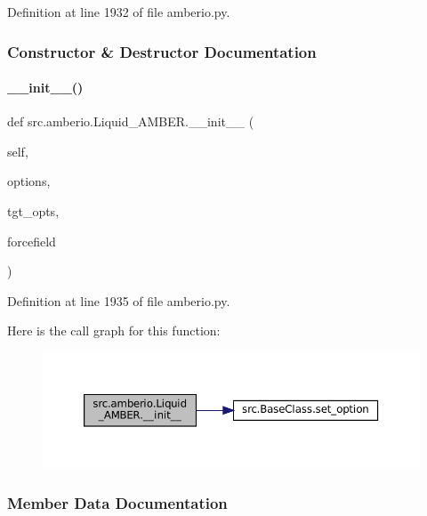 Definition at line 1932 of file amberio.\+py.



\subsubsection{Constructor \& Destructor Documentation}
\mbox{\label{classsrc_1_1amberio_1_1Liquid__AMBER_a2ef4bb756f0d95903ce9aa7cf31f3f4d}} 
\paragraph{\texorpdfstring{\+\_\+\+\_\+init\+\_\+\+\_\+()}{\_\_init\_\_()}}
{\footnotesize\ttfamily def src.\+amberio.\+Liquid\+\_\+\+A\+M\+B\+E\+R.\+\_\+\+\_\+init\+\_\+\+\_\+ (\begin{DoxyParamCaption}\item[{}]{self,  }\item[{}]{options,  }\item[{}]{tgt\+\_\+opts,  }\item[{}]{forcefield }\end{DoxyParamCaption})}



Definition at line 1935 of file amberio.\+py.

Here is the call graph for this function\+:
\nopagebreak
\begin{figure}[H]
\begin{center}
\leavevmode
\includegraphics[width=350pt]{classsrc_1_1amberio_1_1Liquid__AMBER_a2ef4bb756f0d95903ce9aa7cf31f3f4d_cgraph}
\end{center}
\end{figure}


\subsubsection{Member Data Documentation}
\mbox{\label{classsrc_1_1amberio_1_1Liquid__AMBER_a13932bea29afd6143dec7a2b1c921aeb}} 

